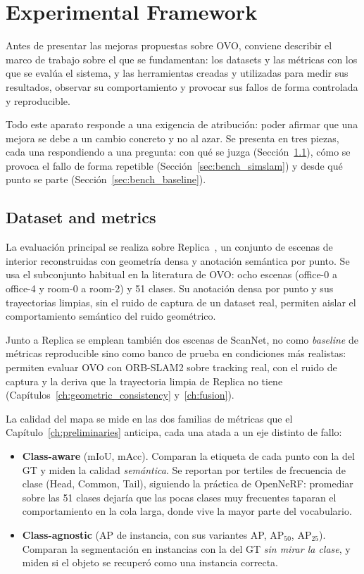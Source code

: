\chapter{Experimental Framework}
\label{ch:benchmark}

Antes de presentar las mejoras propuestas sobre OVO, conviene describir el marco de trabajo
sobre el que se fundamentan: los datasets y las métricas con los que se evalúa el sistema, y
las herramientas creadas y utilizadas para medir sus resultados, observar su comportamiento y
provocar sus fallos de forma controlada y reproducible.

Todo este aparato responde a una exigencia de atribución: poder afirmar que una mejora se
debe a un cambio concreto y no al azar. Se presenta en tres piezas, cada una respondiendo a
una pregunta: con qué se juzga (Sección~\ref{sec:bench_setup}), cómo se provoca el fallo de
forma repetible (Sección~\ref{sec:bench_simslam}) y desde qué punto se parte
(Sección~\ref{sec:bench_baseline}).

\section{Dataset and metrics}
\label{sec:bench_setup}

La evaluación principal se realiza sobre Replica~\parencite{straub2019replica}, un conjunto
de escenas de interior reconstruidas con geometría densa y anotación semántica por punto.
Se usa el subconjunto habitual en la literatura de OVO: ocho escenas (office-0 a office-4 y
room-0 a room-2) y 51 clases. Su anotación densa por punto y sus
trayectorias limpias, sin el ruido de captura de un dataset real, permiten aislar el comportamiento
semántico del ruido geométrico.


Junto a Replica se emplean también dos escenas de ScanNet, no como \emph{baseline} de
métricas reproducible sino como banco de prueba en condiciones más realistas: permiten
evaluar OVO con ORB-SLAM2 sobre tracking real, con el ruido de captura y la deriva que la
trayectoria limpia de Replica no tiene (Capítulos~\ref{ch:geometric_consistency}
y~\ref{ch:fusion}).

La calidad del mapa se mide en las dos familias de métricas que el
Capítulo~\ref{ch:preliminaries} anticipa, cada una atada a un eje distinto de fallo:

\begin{itemize}
  \item \textbf{Class-aware} (mIoU, mAcc). Comparan la etiqueta de cada punto con la del GT y
    miden la calidad \emph{semántica}. Se reportan por tertiles de frecuencia de clase
    (Head, Common, Tail), siguiendo la práctica de OpenNeRF: promediar sobre las 51 clases
    dejaría que las pocas clases muy frecuentes taparan el comportamiento en la cola larga,
    donde vive la mayor parte del vocabulario.
  \item \textbf{Class-agnostic} (AP de instancia, con sus variantes AP, AP$_{50}$, AP$_{25}$).
    Comparan la segmentación en instancias con la del GT \emph{sin mirar la clase}, y miden
    si el objeto se recuperó como una instancia correcta.
\end{itemize}

